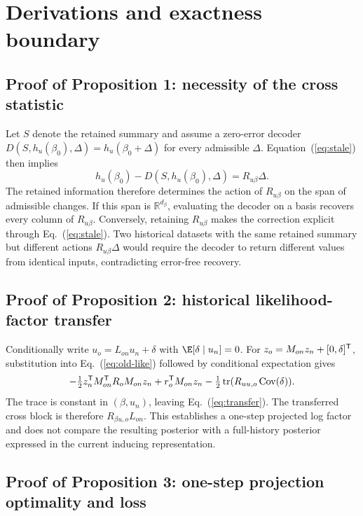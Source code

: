 \section{Derivations and exactness boundary}

\subsection{Proof of Proposition 1: necessity of the cross statistic}
\label{app:cross-necessity}

Let $S$ denote the retained summary and assume a zero-error decoder
$D(S,h_u(\beta_0),\Delta)=h_u(\beta_0+\Delta)$ for every admissible
$\Delta$. Equation~(\ref{eq:stale}) then implies
\[
 h_u(\beta_0)-D(S,h_u(\beta_0),\Delta)=R_{u\beta}\Delta.
\]
The retained information therefore determines the action of $R_{u\beta}$ on the
span of admissible changes. If this span is $\mathbb R^{d_\beta}$, evaluating
the decoder on a basis recovers every column of $R_{u\beta}$. Conversely,
retaining $R_{u\beta}$ makes the correction explicit through
Eq.~(\ref{eq:stale}). Two historical datasets with the same retained summary
but different actions $R_{u\beta}\Delta$ would require the decoder to return
different values from identical inputs, contradicting error-free recovery.

\subsection{Proof of Proposition 2: historical likelihood-factor transfer}
\label{app:joint-transfer}

Conditionally write $u_o=L_{on}u_n+\delta$ with $\E[\delta\mid u_n]=0$. For $z_o=M_{on}z_n+[0,\delta]^{\mathsf T}$, substitution into Eq.~(\ref{eq:old-like}) followed by conditional expectation gives
\[
 -\tfrac12 z_n^{\mathsf T}M_{on}^{\mathsf T}R_oM_{on}z_n
 +r_o^{\mathsf T}M_{on}z_n
 -\tfrac12\operatorname{tr}(R_{uu,o}\operatorname{Cov}(\delta)).
\]
The trace is constant in $(\beta,u_n)$, leaving Eq.~(\ref{eq:transfer}). The transferred cross block is therefore $R_{\beta u,o}L_{on}$. This establishes a one-step projected log factor and does not compare the resulting posterior with a full-history posterior expressed in the current inducing representation.

\subsection{Proof of Proposition 3: one-step projection optimality and loss}
\label{app:transfer-proof}

